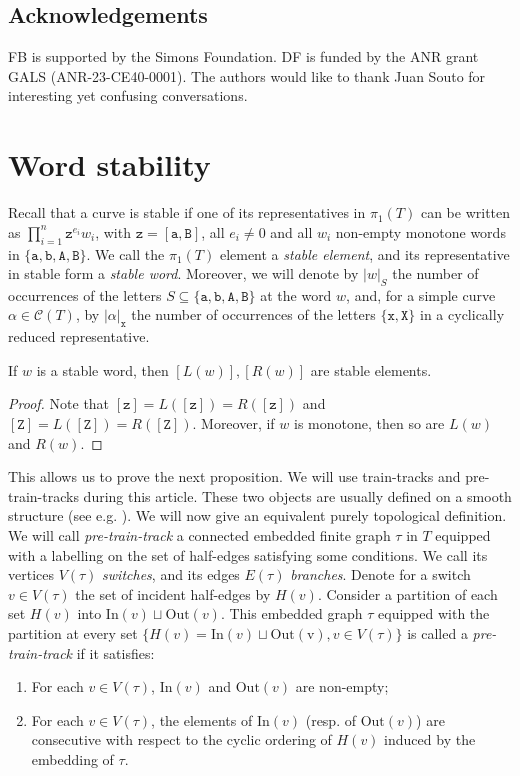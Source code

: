 \documentclass{article}
\begin{document}
	\subsection*{Acknowledgements}
	FB is supported by the Simons Foundation. DF is funded by the ANR grant GALS (ANR-23-CE40-0001). The authors would like to thank Juan Souto for interesting yet confusing conversations.
	
	\section{Word stability}
	
	Recall that a curve is stable if one of its representatives in $\pi_1(T)$ can be written as $\prod_{i=1}^n \mathtt{z}^{e_i}w_i$, with $\mathtt{z}=[\mathtt{a},\mathtt{B}]$, all $e_i\neq0$ and all $w_i$ non-empty monotone words in $\{\mathtt{a},\mathtt{b},\mathtt{A},\mathtt{B}\}$. We call the $\pi_1(T)$ element a \emph{stable element}, and its representative in stable form a \emph{stable word}. Moreover, we will denote by $|w|_S$ the number of occurrences of the letters $S\subseteq \{\mathtt{a},\mathtt{b},\mathtt{A},\mathtt{B}\}$ at the word $w$, and, for a simple curve $\alpha\in\mathcal{C}(T)$, by $|\alpha|_\mathtt{x}$ the number of occurrences of the letters $\{\mathtt{x},\mathtt{X}\}$ in a cyclically reduced representative.
	
	\begin{lemma}\label{lem:stable}
		If $w$ is a stable word, then $[L(w)],[R(w)]$ are stable elements.
	\end{lemma}
	
	\begin{proof}
		Note that $[\mathtt{z}]=L([\mathtt{z}])=R([\mathtt{z}])$ and $[\mathtt{Z}]=L([\mathtt{Z}])=R([\mathtt{Z}])$. Moreover, if $w$ is monotone, then so are $L(w)$ and $R(w)$.
	\end{proof}
	
	This allows us to prove the next proposition. We will use train-tracks and pre-train-tracks during this article. These two objects are usually defined on a smooth structure (see e.g. \cite{ErlandssonSouto}). We will now give an equivalent purely topological definition. We will call \emph{pre-train-track} a connected embedded finite graph $\tau$ in $T$ equipped with a labelling on the set of half-edges satisfying some conditions. We call its vertices $V(\tau)$ \emph{switches}, and its edges $E(\tau)$ \emph{branches}. Denote for a switch $v\in V(\tau)$ the set of incident half-edges by $H(v)$. Consider a partition of each set $H(v)$ into $\mathrm{In}(v)\sqcup \mathrm{Out}(v)$. This embedded graph $\tau$ equipped with the partition at every set $\{H(v)=\mathrm{In}(v)\sqcup \mathrm{Out(v)},v\in V(\tau)\}$ is called a \emph{pre-train-track} if it satisfies: 
	\begin{enumerate}
		\item For each $v\in V(\tau)$, $\mathrm{In}(v)$ and $\mathrm{Out}(v)$ are non-empty;
		\item For each $v\in V(\tau)$, the elements of $\mathrm{In}(v)$ (resp. of $\mathrm{Out}(v)$) are consecutive with respect to the cyclic ordering of $H(v)$ induced by the embedding of $\tau$.
	\end{enumerate}
	
\end{document}
